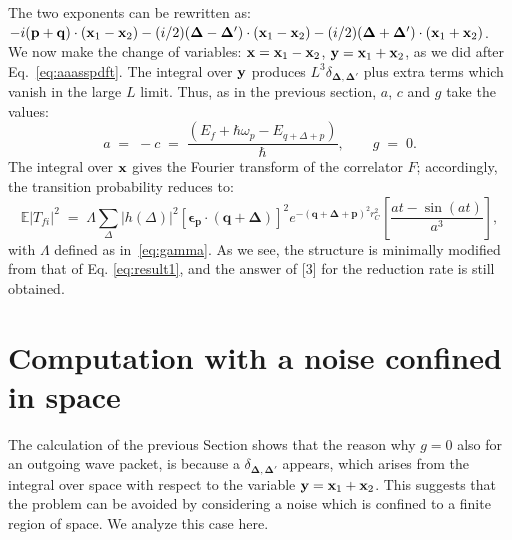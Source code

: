 \documentclass[12pt,onecolumn,amssymb,nofootinbib]{revtex4-2} %
\begin{document}
The two exponents can be rewritten as: $-i({\bf p+q})\cdot ({\bf x}_1 - {\bf x}_2) - (i/2)({\bf \Delta} - {\bf \Delta}') \cdot ({\bf x}_1 - {\bf x}_2) - (i/2)({\bf \Delta} + {\bf \Delta}') \cdot ({\bf x}_1 + {\bf x}_2)$. We now make the change of variables: ${\bf x} = {\bf x}_1 - {\bf x}_2$, ${\bf y} = {\bf x}_1 + {\bf x}_2$, as we did after Eq.~\eqref{eq:aaasspdft}. The integral over ${\bf y}$ produces $L^{3}\delta_{\mathbf{\Delta,\Delta'}}$ plus extra terms which vanish in the large $L$ limit. Thus, as in the previous section, $a$,
$c$ and $g$ take the values:
\begin{equation}
a \; = \; -c \; = \; \frac{\left(E_{f}+\hbar\omega_{p}-E_{q+\Delta+p}\right)}{\hbar},
\qquad g \; = \; 0.
\end{equation}
The integral over ${\bf x}$ gives the Fourier transform of the correlator $F$; accordingly, the transition probability reduces to:
\begin{equation} \label{eq:gfgffg}
\mathbb{E}|T_{fi}|^{2} \; = \; \Lambda
\underset{\Delta}{\sum}\left|h\left(\Delta\right)\right|^{2}
[\mathbf{\epsilon_{p}}\cdot\left(\mathbf{q+\Delta}\right)]^{2}
e^{-\mathbf{\left(\mathbf{q+\Delta+p}\right)}^{2}r_{C}^{2}}
\left[ \frac{at - \sin (at)}{a^{3}} \right],
\end{equation}
with $\Lambda$ defined as in~\eqref{eq:gamma}. As we see, the structure is minimally modified
from that of Eq. \eqref{eq:result1}, and the answer of [3] for the reduction rate is still obtained.

\section{Computation with a noise confined in space}

The calculation of the previous Section shows that the reason why $g=0$ also for an outgoing wave packet, is because a $\delta_{\mathbf{\Delta,\Delta'}}$ appears, which arises from the integral over space with respect to the variable ${\bf y} = {\bf x}_1 + {\bf x}_2$. This suggests that the problem can be avoided by considering a noise which is confined to a finite region of space. We analyze this case here.
\end{document}
